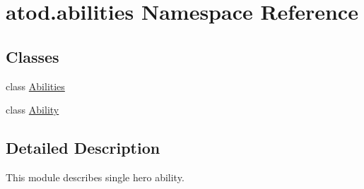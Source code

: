 \hypertarget{namespaceatod_1_1abilities}{}\section{atod.\+abilities Namespace Reference}
\label{namespaceatod_1_1abilities}
\subsection*{Classes}
\begin{DoxyCompactItemize}
\item 
class \hyperlink{classatod_1_1abilities_1_1_abilities}{Abilities}
\item 
class \hyperlink{classatod_1_1abilities_1_1_ability}{Ability}
\end{DoxyCompactItemize}


\subsection{Detailed Description}
\begin{DoxyVerb}This module describes single hero ability.\end{DoxyVerb}
 